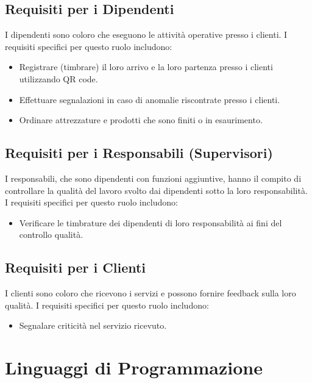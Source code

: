 \documentclass[twoside]{supsistudent}
\begin{document}
\subsection{Requisiti per i Dipendenti}

I dipendenti sono coloro che eseguono le attività operative presso i clienti. I requisiti specifici per questo ruolo includono:

\begin{itemize}
  \item Registrare (timbrare) il loro arrivo e la loro partenza presso i clienti utilizzando QR code.
  \item Effettuare segnalazioni in caso di anomalie riscontrate presso i clienti.
  \item Ordinare attrezzature e prodotti che sono finiti o in esaurimento.
\end{itemize}

\subsection{Requisiti per i Responsabili (Supervisori)}

I responsabili, che sono dipendenti con funzioni aggiuntive, hanno il compito di controllare la qualità del lavoro svolto dai dipendenti sotto la loro responsabilità. I requisiti specifici per questo ruolo includono:

\begin{itemize}
  \item Verificare le timbrature dei dipendenti di loro responsabilità ai fini del controllo qualità.
\end{itemize}

\subsection{Requisiti per i Clienti}

I clienti sono coloro che ricevono i servizi e possono fornire feedback sulla loro qualità. I requisiti specifici per questo ruolo includono:

\begin{itemize}
  \item Segnalare criticità nel servizio ricevuto.
\end{itemize}

\section{Linguaggi di Programmazione}
\end{document}
